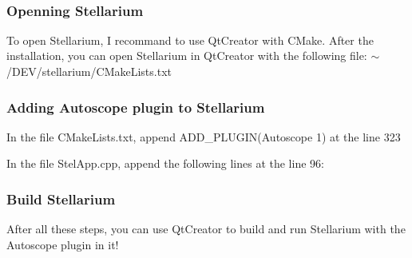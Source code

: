~\newline


\subsubsection*{Openning Stellarium}

To open Stellarium, I recommand to use Qt\+Creator with C\+Make. After the installation, you can open Stellarium in Qt\+Creator with the following file\+: $\sim$/\+D\+E\+V/stellarium/\+C\+Make\+Lists.txt

\subsubsection*{Adding Autoscope plugin to Stellarium}


\begin{DoxyItemize}
\item In the file C\+Make\+Lists.\+txt, append {\ttfamily A\+D\+D\+\_\+\+P\+L\+U\+G\+I\+N(\+Autoscope 1)} at the line 323
\item In the file Stel\+App.\+cpp, append the following lines at the line 96\+: 
\begin{DoxyCode}{0}
\end{DoxyCode}

\end{DoxyItemize}

\subsubsection*{Build Stellarium}

After all these steps, you can use Qt\+Creator to build and run Stellarium with the Autoscope plugin in it! 